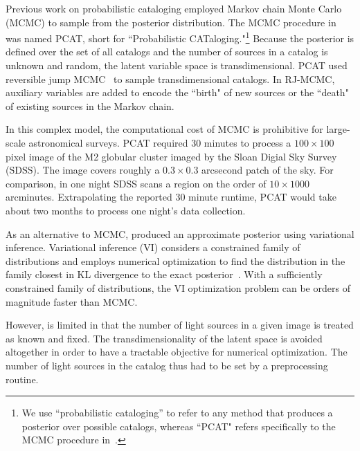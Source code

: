 Previous work on probabilistic cataloging employed Markov chain Monte Carlo (MCMC) to sample from the posterior distribution.
The MCMC procedure in~\cite{Portillo_2017, Feder_2019}
was named PCAT, short for ``Probabilistic CATaloging."\footnote{
We use ``probabilistic cataloging'' to refer to any method that produces a posterior over possible catalogs, whereas ``PCAT" refers specifically to the MCMC procedure in~\cite{Portillo_2017, Feder_2019}. }
Because the posterior is defined over the set of all catalogs and the number of sources in a catalog is unknown and random, 
the latent variable space is transdimensional. PCAT
used reversible jump MCMC~\cite{Green95reversiblejump} to sample transdimensional catalogs. In RJ-MCMC, auxiliary variables are added to encode the ``birth" of new sources 
or the ``death" of existing sources in the Markov chain.

In this complex model, the computational cost of MCMC is prohibitive for large-scale astronomical surveys. 
PCAT required 30 minutes to process a $100\times 100$ pixel image of the M2 globular cluster imaged by the Sloan Digial Sky Survey (SDSS). 
The image covers roughly a $0.3\times0.3$ arcsecond patch of the sky.
For comparison, in one night SDSS scans a region on the order of $10 \times 1000$ arcminutes. 
Extrapolating the reported 30 minute runtime, PCAT would take about two months to process one night's data collection.

As an alternative to MCMC, \cite{regier2019_celeste} produced an approximate posterior using variational inference.
Variational inference (VI) considers a constrained family of distributions and employs numerical optimization to find the distribution in the family closest
in KL divergence to the exact posterior~\cite{Blei_2017_vi_review,Jordan_intro_vi, Wainwrite_graph_models_vi}. 
With a sufficiently constrained family of distributions, the VI optimization problem can be orders of magnitude faster than MCMC. 

However, \cite{regier2019_celeste} is limited in that the number of light sources in a given image is treated as known and fixed. The transdimensionality of the latent space is avoided altogether in order to have a tractable objective for numerical optimization. 
The number of light sources in the catalog thus had to be set by a preprocessing routine. 

\bigbreak


\nopagebreak[4]

